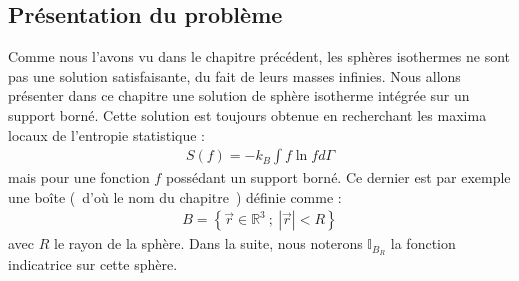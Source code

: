 \subsection{Présentation du problème}
	Comme nous l'avons vu dans le chapitre précédent, les sphères isothermes ne sont pas une solution satisfaisante, du fait de leurs masses infinies.
	Nous allons présenter dans ce chapitre une solution de sphère isotherme intégrée sur un support borné. Cette solution est toujours obtenue en recherchant les maxima locaux de l'entropie statistique :
	\begin{align*}
		S(f) = - k_B \int f \ln f d\Gamma
	\end{align*}
	mais pour une fonction $f$ possédant un support borné. Ce dernier est par exemple une boîte (~d'où le nom du chapitre~) définie comme :
	\begin{align}
		B = \left\{ \vec{r} \in \mathbb{R}^3\ ;\ \left|\vec{r}\right| < R\right\}
	\end{align}
	avec $R$ le rayon de la sphère. Dans la suite, nous noterons $\mathbb{I}_{B_R}$ la fonction indicatrice sur cette sphère.

